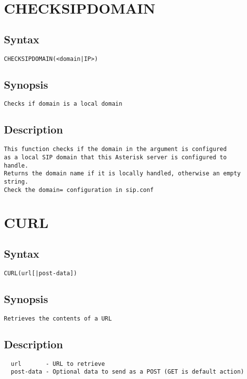 \section{CHECKSIPDOMAIN}
\subsection{Syntax}
\begin{verbatim}
CHECKSIPDOMAIN(<domain|IP>)
\end{verbatim}
\subsection{Synopsis}
\begin{verbatim}
Checks if domain is a local domain
\end{verbatim}
\subsection{Description}
\begin{verbatim}
This function checks if the domain in the argument is configured
as a local SIP domain that this Asterisk server is configured to handle.
Returns the domain name if it is locally handled, otherwise an empty string.
Check the domain= configuration in sip.conf

\end{verbatim}


\section{CURL}
\subsection{Syntax}
\begin{verbatim}
CURL(url[|post-data])
\end{verbatim}
\subsection{Synopsis}
\begin{verbatim}
Retrieves the contents of a URL
\end{verbatim}
\subsection{Description}
\begin{verbatim}
  url       - URL to retrieve
  post-data - Optional data to send as a POST (GET is default action)

\end{verbatim}


